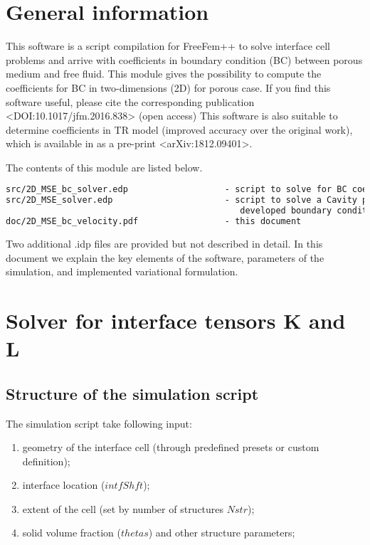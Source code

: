 \documentclass[12pt,a4paper]{article}
\begin{document}
\sloppy

\section{General information}

This software is a script compilation for FreeFem++ to solve interface cell problems and arrive with coefficients in boundary condition (BC) between porous medium and free fluid. This module gives the possibility to compute the coefficients for BC in two-dimensions (2D) for porous case. If you find this software useful, please cite the corresponding publication <DOI:10.1017/jfm.2016.838> (open access) This software is also suitable
to determine coefficients in TR model (improved accuracy over the original work), which
is available in as a pre-print <arXiv:1812.09401>.

The contents of this module are listed below.
\begin{lstlisting}[language=tex]
src/2D_MSE_bc_solver.edp                   - script to solve for BC coefficients tensor
src/2D_MSE_solver.edp                      - script to solve a Cavity problem with
                                              developed boundary conditions
doc/2D_MSE_bc_velocity.pdf                 - this document
\end{lstlisting}

Two additional .idp files are provided but not described in detail. In this document we explain the key elements of the software, parameters of the simulation, and implemented variational formulation.

\section{Solver for interface tensors K and L}

\subsection{Structure of the simulation script}

The simulation script take following input:
\begin{enumerate}
    \item geometry of the interface cell (through predefined presets or custom definition);
	\item interface location ($intfShft$);
    \item extent of the cell (set by number of structures $Nstr$);
    \item solid volume fraction ($thetas$) and other structure parameters;
\end{enumerate}
\end{document}
